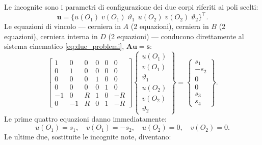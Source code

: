 




	
	
	Le incognite sono i parametri di configurazione dei due
	corpi riferiti ai poli scelti:
	\begin{equation*}
		\bm{u} =
		\bigl\{u(O_1)\; v(O_1)\; \vartheta_1\,\;
		u(O_2)\; v(O_2)\; \vartheta_2
		\bigr\}^\top.
	\end{equation*}
	Le equazioni di vincolo --- cerniera in $A$ (2 equazioni),
	cerniera in $B$ (2 equazioni), cerniera interna in $D$
	(2 equazioni) --- conducono direttamente al sistema
	cinematico \eqref{eq:due_problemi}, $\bm{A}\bm{u} = \bm{s}$:
	\begin{equation*}
		\begin{bmatrix}
			1 & 0 &  0 & 0 & 0 &  0 \\
			0 & 1 &  0 & 0 & 0 &  0 \\
			0 & 0 &  0 & 1 & 0 &  0 \\
			0 & 0 &  0 & 0 & 1 &  0 \\
			-1 & 0 & R & 1 & 0 &  -R \\
			0 & -1 &  R & 0 & 1 & - R
		\end{bmatrix}
		\begin{Bmatrix}
			u(O_1) \\ v(O_1) \\ \vartheta_1 \\
			u(O_2) \\ v(O_2) \\ \vartheta_2
		\end{Bmatrix}
		=
		\begin{Bmatrix}
			s_1 \\ -s_2 \\ 0 \\ 0 \\ s_3 \\ s_4
		\end{Bmatrix}.
	\end{equation*}
	Le prime quattro equazioni danno immediatamente:
	\begin{equation*}
		u(O_1) = s_1, \quad
		v(O_1) = -s_2, \quad
		u(O_2) = 0, \quad
		v(O_2) = 0.
	\end{equation*}
	Le ultime due, sostituite le incognite note, diventano:
